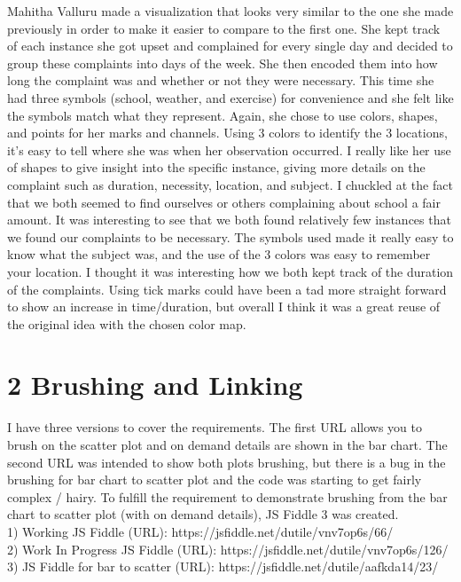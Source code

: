 \documentclass{neu_handout}
\begin{document}
Mahitha Valluru made a visualization that looks very similar to the one she made previously in order to make it easier to compare to the first one. She kept track of each instance she got upset and complained for every single day and decided to group these complaints into days of the week. She then encoded them into how long the complaint was and whether or not they were necessary. This time she had three symbols (school, weather, and exercise) for convenience and she felt like the symbols match what they represent. Again, she chose to use colors, shapes, and points for her marks and channels. Using 3 colors to identify the 3 locations, it’s easy to tell where she was when her observation occurred. I really like her use of shapes to give insight into the specific instance, giving more details on the complaint such as duration, necessity, location, and subject. I chuckled at the fact that we both seemed to find ourselves or others complaining about school a fair amount. It was interesting to see that we both found relatively few instances that we found our complaints to be necessary. The symbols used made it really easy to know what the subject was, and the use of the 3 colors was easy to remember your location. I thought it was interesting how we both kept track of the duration of the complaints. Using tick marks could have been a tad more straight forward to show an increase in time/duration, but overall I think it was a great reuse of the original idea with the chosen color map.


\section*{2 Brushing and Linking}

I have three versions to cover the requirements. The first URL allows you to brush on the scatter plot and on demand details are shown in the bar chart. The second URL was intended to show both plots brushing, but there is a bug in the brushing for bar chart to scatter plot and the code was starting to get fairly complex / hairy. To fulfill the requirement to demonstrate brushing from the bar chart to scatter plot (with on demand details), JS Fiddle 3 was created.\\

1) Working JS Fiddle (URL): https://jsfiddle.net/dutile/vnv7op6s/66/\\
2) Work In Progress JS Fiddle (URL): https://jsfiddle.net/dutile/vnv7op6s/126/ \\
3) JS Fiddle for bar to scatter (URL): https://jsfiddle.net/dutile/aafkda14/23/\\
\end{document}
